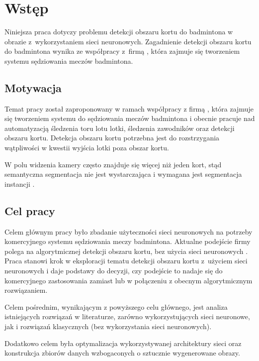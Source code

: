 \chapter{Wstęp}

Niniejsza praca dotyczy problemu detekcji obszaru kortu do badmintona w obrazie z~wykorzystaniem sieci neuronowych.
Zagadnienie detekcji obszaru kortu do badmintona wynika ze współpracy z~firmą \blue{}, która zajmuje się tworzeniem systemu sędziowania meczów badmintona.

\section{Motywacja}

Temat pracy został zaproponowany w ramach współpracy z firmą \blue{}, która zajmuje się tworzeniem systemu do sędziowania meczów badmintona i obecnie pracuje nad automatyzacją śledzenia toru lotu lotki, śledzenia zawodników oraz detekcji obszaru kortu.
Detekcja obszaru kortu potrzebna jest do rozstrzygania wątpliwości w kwestii wyjścia lotki poza obszar kortu.

W polu widzenia kamery często znajduje się więcej niż jeden kort, stąd semantyczna segmentacja nie jest wystarczająca i wymagana jest segmentacja instancji .

\section{Cel pracy}

Celem głównym pracy było zbadanie użyteczności sieci neuronowych na potrzeby komercyjnego systemu sędziowania meczy badmintona.
Aktualne podejście firmy \blue{} polega na algorytmicznej detekcji obszaru kortu, bez użycia sieci neuronowych .
Praca stanowi krok w eksploracji tematu detekcji obszaru kortu z~użyciem sieci neuronowych i daje podstawy do decyzji, czy podejście to nadaje się do komercyjnego zastosowania zamiast lub w połączeniu z obecnym algorytmicznym rozwiązaniem.

Celem pośrednim, wynikającym z powyższego celu głównego, jest analiza istniejących rozwiązań w literaturze, zarówno wykorzystujących sieci neuronowe, jak i rozwiązań klasycznych (bez wykorzystania sieci neuronowych).

Dodatkowo celem była optymalizacja wykorzystywanej architektury sieci oraz konstrukcja zbiorów danych wzbogaconych o sztucznie wygenerowane obrazy.
\\

